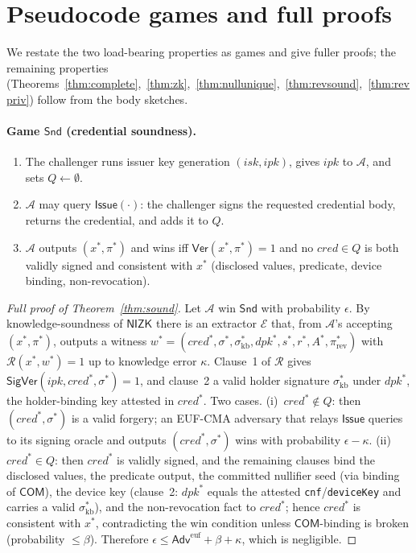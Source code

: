 \documentclass[11pt]{article}
\theoremstyle{plain}
\theoremstyle{definition}
\begin{document}
\appendix
\section{Pseudocode games and full proofs}\label{app:proofs}

We restate the two load-bearing properties as games and give fuller proofs; the
remaining properties (Theorems~\ref{thm:complete},~\ref{thm:zk},~\ref{thm:nullunique},~\ref{thm:revsound},~\ref{thm:revpriv})
follow from the body sketches.

\paragraph{Game $\mathsf{Snd}$ (credential soundness).}
\begin{enumerate}
\item The challenger runs issuer key generation $(\mathit{isk},\mathit{ipk})$, gives $\mathit{ipk}$ to $\mathcal{A}$, and sets $Q\gets\emptyset$.
\item $\mathcal{A}$ may query $\mathsf{Issue}(\cdot)$: the challenger signs the requested credential body, returns the credential, and adds it to $Q$.
\item $\mathcal{A}$ outputs $(x^*,\pi^*)$ and wins iff $\mathsf{Ver}(x^*,\pi^*)=1$ and no $\mathit{cred}\in Q$ is both validly signed and consistent with $x^*$ (disclosed values, predicate, device binding, non-revocation).
\end{enumerate}

\begin{proof}[Full proof of Theorem~\ref{thm:sound}]
Let $\mathcal{A}$ win $\mathsf{Snd}$ with probability $\epsilon$. By knowledge-soundness
of $\mathsf{NIZK}$ there is an extractor $\mathcal{E}$ that, from $\mathcal{A}$'s
accepting $(x^*,\pi^*)$, outputs a witness
$w^*=(\mathit{cred}^*,\sigma^*,\sigma_{\mathrm{kb}}^*,\mathit{dpk}^*,\allowbreak
s^*,r^*,A^*,\pi_{\mathrm{rev}}^*)$ with
$\mathcal{R}(x^*,w^*)=1$ up to knowledge error $\kappa$. Clause~1 of $\mathcal{R}$ gives
$\mathsf{SigVer}(\mathit{ipk},\mathit{cred}^*,\sigma^*)=1$, and clause~2 a valid holder
signature $\sigma_{\mathrm{kb}}^*$ under $\mathit{dpk}^*$, the holder-binding key
attested in $\mathit{cred}^*$. Two cases.
(i)~$\mathit{cred}^*\notin Q$: then $(\mathit{cred}^*,\sigma^*)$ is a valid forgery; an
EUF-CMA adversary that relays $\mathsf{Issue}$ queries to its signing oracle and outputs
$(\mathit{cred}^*,\sigma^*)$ wins with probability $\epsilon-\kappa$.
(ii)~$\mathit{cred}^*\in Q$: then $\mathit{cred}^*$ is validly signed, and the remaining
clauses bind the disclosed values, the predicate output, the committed nullifier seed (via
binding of $\mathsf{COM}$), the device key (clause~2: $\mathit{dpk}^*$ equals the attested
\texttt{cnf}/\texttt{deviceKey} and carries a valid $\sigma_{\mathrm{kb}}^*$), and the
non-revocation fact to $\mathit{cred}^*$; hence
$\mathit{cred}^*$ is consistent with $x^*$, contradicting the win condition unless
$\mathsf{COM}$-binding is broken (probability $\le\beta$). Therefore
$\epsilon\le\mathsf{Adv}^{\mathrm{euf}}+\beta+\kappa$, which is negligible.
\end{proof}
\end{document}
